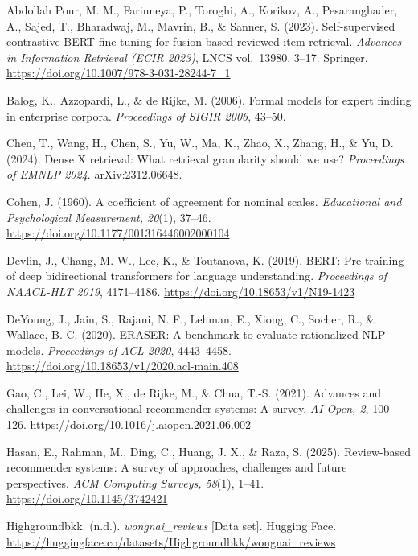 Abdollah Pour, M. M., Farinneya, P., Toroghi, A., Korikov, A., Pesaranghader, A.,
Sajed, T., Bharadwaj, M., Mavrin, B., \& Sanner, S. (2023).
Self-supervised contrastive BERT fine-tuning for fusion-based reviewed-item retrieval.
\emph{Advances in Information Retrieval (ECIR 2023)}, LNCS vol.~13980, 3--17. Springer.
\url{https://doi.org/10.1007/978-3-031-28244-7_1}

Balog, K., Azzopardi, L., \& de Rijke, M. (2006). Formal models for expert finding in
enterprise corpora. \emph{Proceedings of SIGIR 2006}, 43--50.

Chen, T., Wang, H., Chen, S., Yu, W., Ma, K., Zhao, X., Zhang, H., \& Yu, D. (2024). Dense X
retrieval: What retrieval granularity should we use? \emph{Proceedings of EMNLP 2024}.
arXiv:2312.06648.

Cohen, J. (1960). A coefficient of agreement for nominal scales. \emph{Educational and
Psychological Measurement, 20}(1), 37--46.
\url{https://doi.org/10.1177/001316446002000104}

Devlin, J., Chang, M.-W., Lee, K., \& Toutanova, K. (2019).
BERT: Pre-training of deep bidirectional transformers for language understanding.
\emph{Proceedings of NAACL-HLT 2019}, 4171--4186.
\url{https://doi.org/10.18653/v1/N19-1423}

DeYoung, J., Jain, S., Rajani, N. F., Lehman, E., Xiong, C., Socher, R., \& Wallace, B. C.
(2020). ERASER: A benchmark to evaluate rationalized NLP models. \emph{Proceedings of ACL
2020}, 4443--4458. \url{https://doi.org/10.18653/v1/2020.acl-main.408}

Gao, C., Lei, W., He, X., de Rijke, M., \& Chua, T.-S. (2021).
Advances and challenges in conversational recommender systems: A survey.
\emph{AI Open, 2}, 100--126.
\url{https://doi.org/10.1016/j.aiopen.2021.06.002}

Hasan, E., Rahman, M., Ding, C., Huang, J. X., \& Raza, S. (2025). Review-based recommender
systems: A survey of approaches, challenges and future perspectives. \emph{ACM Computing
Surveys, 58}(1), 1--41. \url{https://doi.org/10.1145/3742421}

Highgroundbkk. (n.d.). \emph{wongnai\_reviews} [Data set]. Hugging Face.
\url{https://huggingface.co/datasets/Highgroundbkk/wongnai_reviews}

